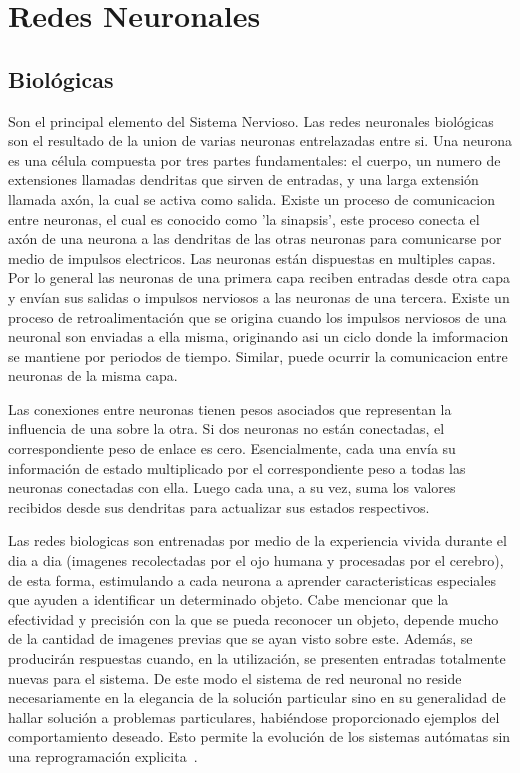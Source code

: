 \section{Redes Neuronales}
\subsection{Biológicas}

Son el principal elemento del Sistema Nervioso. Las redes neuronales biológicas son el resultado de la union de varias neuronas entrelazadas entre si. Una neurona es una célula compuesta por tres partes fundamentales: el cuerpo, un numero de extensiones llamadas dendritas que sirven de entradas, y una larga extensión llamada axón, la cual se activa como salida. Existe un proceso de comunicacion entre neuronas, el cual es conocido como 'la sinapsis', este proceso conecta el axón de una neurona a las dendritas de las otras neuronas para comunicarse por medio de impulsos electricos. Las neuronas están dispuestas en multiples capas. Por lo general las neuronas de una primera capa reciben entradas desde otra capa y envían sus salidas o impulsos nerviosos a las neuronas de una tercera. Existe un proceso de retroalimentación que se origina cuando los impulsos nerviosos de una neuronal son enviadas a ella misma, originando asi un ciclo donde la imformacion se mantiene por periodos de tiempo. Similar, puede ocurrir la comunicacion entre neuronas de la misma capa.

Las conexiones entre neuronas tienen pesos asociados que representan la influencia de una sobre la otra. Si dos neuronas no están conectadas, el correspondiente peso de enlace es cero. Esencialmente, cada una envía su información de estado multiplicado por el correspondiente peso a todas las neuronas conectadas con ella. Luego
cada una, a su vez, suma los valores recibidos desde sus dendritas para actualizar sus estados respectivos.

Las redes biologicas son entrenadas por medio de la experiencia vivida durante el dia a dia (imagenes recolectadas por el ojo humana y procesadas por el cerebro), de esta forma, estimulando a cada neurona a aprender caracteristicas especiales que ayuden a identificar un determinado objeto. Cabe mencionar que la efectividad y precisión con la que se pueda reconocer un objeto, depende mucho de la cantidad de imagenes previas que se ayan visto sobre este. Además, se producirán respuestas cuando, en la utilización, se presenten entradas totalmente nuevas para el sistema. De este modo el sistema de red neuronal no reside necesariamente en la elegancia de la solución particular sino en su generalidad de hallar solución a problemas particulares, habiéndose proporcionado ejemplos del comportamiento deseado. Esto permite la evolución de los sistemas autómatas sin una reprogramación explicita~\cite{21RedesNeuronales}.

